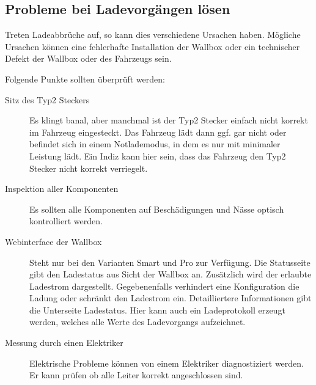 \documentclass[a4paper,10pt]{article}
\begin{document}
\begin{multicols*}{2}
    \subsection{Probleme bei Ladevorgängen lösen}
    Treten Ladeabbrüche auf, so kann dies verschiedene Ursachen haben. Mögliche
    Ursachen können eine fehlerhafte Installation der Wallbox oder ein
    technischer Defekt der Wallbox oder des Fahrzeugs sein.

    Folgende Punkte sollten überprüft werden:
    \begin{description}
        \item[Sitz des Typ2 Steckers] Es klingt banal, aber manchmal ist der
        Typ2 Stecker einfach nicht korrekt im Fahrzeug eingesteckt. Das    Fahrzeug
        lädt dann ggf. gar nicht oder befindet sich in einem Notlademodus, in
        dem es nur mit minimaler Leistung lädt. Ein Indiz kann hier sein, dass
        das Fahrzeug den Typ2 Stecker nicht korrekt verriegelt.
        \item[Inspektion aller Komponenten] Es sollten alle Komponenten
        auf Beschädigungen und Nässe optisch kontrolliert werden.
        \item[Webinterface der Wallbox] Steht nur bei den Varianten Smart und
        Pro zur Verfügung. Die Statusseite gibt den Ladestatus aus
        Sicht der Wallbox an. Zusätzlich wird der erlaubte Ladestrom
        dargestellt. Gegebenenfalls verhindert eine Konfiguration die Ladung
        oder schränkt den Ladestrom ein. Detailliertere Informationen gibt die
        Unterseite Ladestatus. Hier kann auch ein Ladeprotokoll
        erzeugt werden, welches alle Werte des Ladevorgangs aufzeichnet.
        \item[Messung durch einen Elektriker] Elektrische Probleme können von
        einem Elektriker diagnostiziert werden. Er kann prüfen ob alle Leiter
        korrekt angeschlossen sind.
    \end{description}


\end{multicols*}
\end{document}
